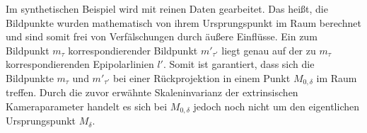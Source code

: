 %
% 
%
%
%
%

Im synthetischen Beispiel wird mit reinen Daten gearbeitet. Das heißt, die Bildpunkte wurden mathematisch von ihrem Ursprungspunkt im Raum berechnet und sind somit frei von Verfälschungen durch äußere Einflüsse. Ein zum Bildpunkt $m_\tau$ korrespondierender Bildpunkt $m'_{\tau'}$ liegt genau auf der zu $m_\tau$ korrespondierenden Epipolarlinien $l'$. Somit ist garantiert, dass sich die Bildpunkte $m_\tau$ und $m'_{\tau'}$ bei einer Rückprojektion in einem Punkt $M_{0,\delta}$ im Raum treffen. Durch die zuvor erwähnte Skaleninvarianz der extrinsischen Kameraparameter handelt es sich bei $M_{0,\delta}$ jedoch noch nicht um den eigentlichen Ursprungspunkt $M_\delta$. \\

